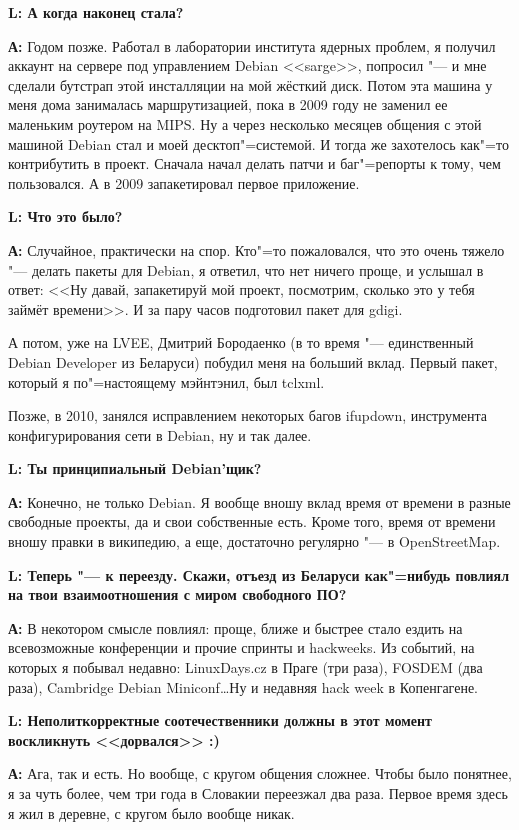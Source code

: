 \documentclass[10pt, a5paper]{article}
\begin{document}
{\noindent \bf L: А когда наконец стала?}

{\noindent \bf А:} Годом позже. Работал в лаборатории института ядерных проблем, я получил аккаунт на сервере под управлением Debian <<sarge>>, попросил "--- и мне сделали бутстрап этой инсталляции на мой жёсткий диск. Потом эта машина у меня дома занималась маршрутизацией, пока в 2009 году не заменил ее маленьким роутером на MIPS. Ну а через несколько месяцев общения с этой машиной Debian стал и моей десктоп"=системой. И тогда же захотелось как"=то контрибутить в проект. Сначала начал делать патчи и баг"=репорты к тому, чем пользовался. А в 2009 запакетировал первое приложение.

{\noindent \bf L: Что это было?}

{\noindent \bf А:} Случайное, практически на спор. Кто"=то  пожаловался, что это очень тяжело "--- делать пакеты для Debian, я ответил, что нет ничего проще, и услышал в ответ: <<Ну давай, запакетируй мой проект, посмотрим, сколько это у тебя займёт времени>>. И за пару часов подготовил пакет для gdigi.

А потом, уже на LVEE, Дмитрий Бородаенко (в то время "--- единственный Debian Developer из Беларуси) побудил меня на больший вклад. Первый пакет, который я по"=настоящему мэйнтэнил, был tclxml.

Позже, в 2010, занялся исправлением некоторых багов ifupdown, инструмента конфигурирования сети в Debian, ну и так далее.

{\noindent \bf L: Ты принципиальный Debian'щик?}

{\noindent \bf А:} Конечно, не только Debian. Я вообще вношу вклад время от времени в разные свободные проекты, да и свои собственные есть.
Кроме того, время от времени вношу правки в википедию, а еще, достаточно регулярно "--- в OpenStreetMap.

{\noindent \bf L: Теперь "--- к переезду. Скажи, отъезд из Беларуси как"=нибудь повлиял на твои взаимоотношения с миром свободного ПО?}

{\noindent \bf А:} В некотором смысле повлиял: проще, ближе и быстрее стало ездить на всевозможные конференции и прочие спринты и hackweeks. Из событий, на которых я побывал недавно: LinuxDays.cz в Праге (три раза), FOSDEM (два раза), Cambridge Debian Miniconf\ldots Ну и недавняя hack week в Копенгагене.

{\noindent \bf L: Неполиткорректные соотечественники должны в этот момент воскликнуть <<дорвался>> :)}

{\noindent \bf А:} Ага, так и есть. Но вообще, с кругом общения сложнее. Чтобы было понятнее, я за чуть более, чем три года в Словакии переезжал два раза. Первое время здесь я жил в деревне, с кругом было вообще никак.
\end{document}
